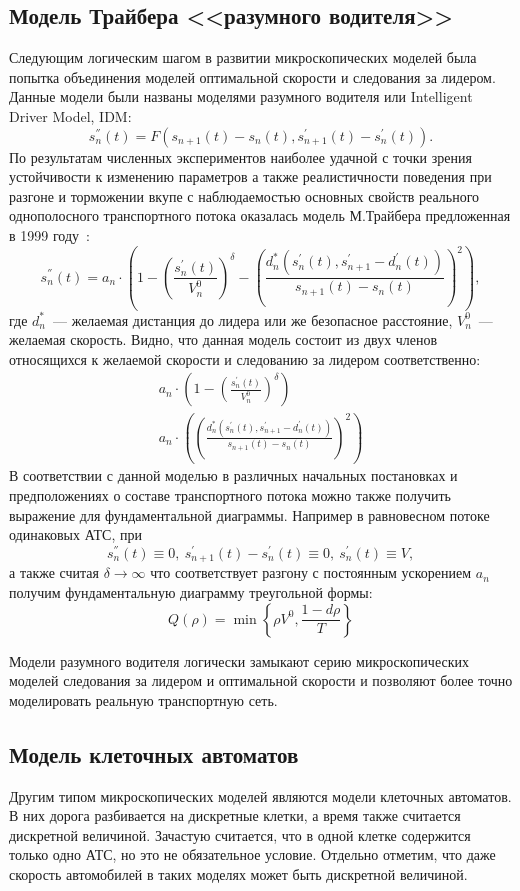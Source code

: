\subsection{Модель Трайбера <<разумного водителя>>}\label{subsec:ch1/sec2/sub3}
Следующим логическим шагом в развитии микроскопических моделей была попытка объединения моделей оптимальной скорости и следования за лидером.
Данные модели были названы моделями разумного водителя или Intelligent Driver Model, IDM:
\[
    s_n^{''}(t) = F(s_{n+1}(t) - s_n(t), s_{n+1}^{'}(t) - s_n^{'}(t)).
\]
По результатам численных экспериментов наиболее удачной с точки зрения устойчивости к изменению параметров а также реалистичности поведения при разгоне и торможении вкупе с наблюдаемостью основных свойств реального однополосного транспортного потока оказалась модель М.Трайбера предложенная в 1999 году~\cite{treiber1999explanation}:
\[
    s_n^{''}(t) = a_n\cdot \left( 1 - \left( \frac{s_n^{'}(t)}{V_n^0} \right)^{\delta} - \left(\frac{d_n^*(s_n^{'}(t), s_{n+1}^{'} - d_n^{'}(t))}{s_{n+1}(t) - s_n(t)}\right)^2 \right),
\]
где \(d_n^*\)~--- желаемая дистанция до лидера или же безопасное расстояние, \(V_n^0\)~--- желаемая скорость.
Видно, что данная модель состоит из двух членов относящихся к желаемой скорости и следованию за лидером соответственно:
\[
\begin{array}{rl}
    a_n\cdot \left( 1 - \left( \frac{s_n^{'}(t)}{V_n^0} \right)^{\delta}\right) \\
    a_n\cdot \left( \left(\frac{d_n^*(s_n^{'}(t), s_{n+1}^{'} - d_n^{'}(t))}{s_{n+1}(t) - s_n(t)}\right)^2 \right)
\end{array}
\]
В соответствии с данной моделью в различных начальных постановках и предположениях о составе транспортного потока можно также получить выражение для фундаментальной диаграммы.
Например в равновесном потоке одинаковых АТС, при
\[
    s_n^{''}(t) \equiv 0,\ s_{n+1}^{'}(t) - s_n^{'}(t) \equiv 0,\ s_n^{'}(t)\equiv V,
\]
а также считая \(\delta\rightarrow \infty\) что соответствует разгону с постоянным ускорением \(a_n\) получим фундаментальную диаграмму треугольной формы:
\[
    Q(\rho) = \min\left\{\rho V^0, \frac{1-d\rho}{T} \right\}
\]

Модели разумного водителя логически замыкают серию микроскопических моделей следования за лидером и оптимальной скорости и позволяют более точно моделировать реальную транспортную сеть.


\subsection{Модель клеточных автоматов}\label{subsec:ch1/sec2/sub4}
Другим типом микроскопических моделей являются модели клеточных автоматов.
В них дорога разбивается на дискретные клетки, а время также считается дискретной величиной.
Зачастую считается, что в одной клетке содержится только одно АТС, но это не обязательное условие.
Отдельно отметим, что даже скорость автомобилей в таких моделях может быть дискретной величиной.

